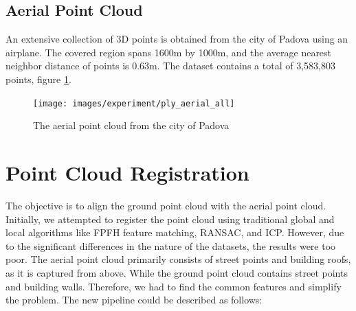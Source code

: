 \documentclass[11pt]{article}
\begin{document}
    \subsection{Aerial Point Cloud}
    An extensive collection of 3D points is obtained from the city of Padova
    using an airplane. The covered region spans 1600m by 1000m, and the average nearest neighbor distance
    of points is 0.63m. The dataset contains a total of 3,583,803 points, figure \ref{fig:ply_aerial_all}.

    \begin{figure}
    \centering
    \texttt{[image: images/experiment/ply\_aerial\_all]}
    \caption{The aerial point cloud from the city of Padova}
    \label{fig:ply_aerial_all}
    \end{figure}

    \section{Point Cloud Registration}
    The objective is to align the ground point cloud with the aerial point cloud. Initially, we attempted
    to register the point cloud using traditional global and local algorithms like FPFH feature matching,
    RANSAC, and ICP. However, due to the significant differences in the nature of the datasets, the results were
    too poor. The aerial point cloud primarily consists of street points and building roofs, as it is captured
    from above. While the ground point cloud contains street points and building walls. Therefore, we had to
    find the common features and simplify the problem. The new pipeline could be described as follows:
\end{document}
